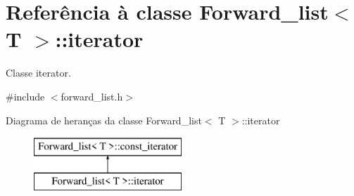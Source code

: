 \hypertarget{class_forward__list_1_1iterator}{}\section{Referência à classe Forward\+\_\+list$<$ T $>$\+:\+:iterator}
\label{class_forward__list_1_1iterator}


Classe iterator.  




{\ttfamily \#include $<$forward\+\_\+list.\+h$>$}

Diagrama de heranças da classe Forward\+\_\+list$<$ T $>$\+:\+:iterator\begin{figure}[H]
\begin{center}
\leavevmode
\includegraphics[height=2.000000cm]{class_forward__list_1_1iterator}
\end{center}
\end{figure}
